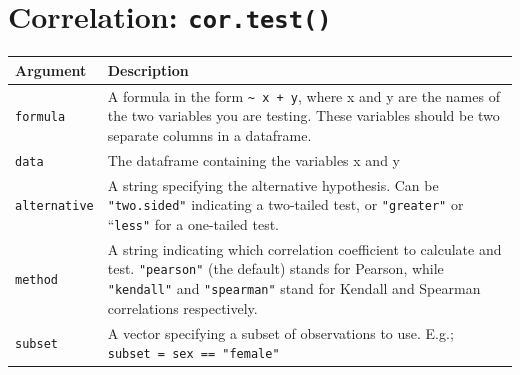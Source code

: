 \documentclass[]{book}
\theoremstyle{definition}
\theoremstyle{definition}
\theoremstyle{remark}
\begin{document}
\section{\texorpdfstring{Correlation:
\texttt{cor.test()}}{Correlation: cor.test()}}\label{correlation-cor.test}

\begin{longtable}[]{@{}ll@{}}
\toprule
\begin{minipage}[b]{0.18\columnwidth}\raggedright\strut
Argument\strut
\end{minipage} & \begin{minipage}[b]{0.67\columnwidth}\raggedright\strut
Description\strut
\end{minipage}\tabularnewline
\midrule
\endhead
\begin{minipage}[t]{0.18\columnwidth}\raggedright\strut
\texttt{formula}\strut
\end{minipage} & \begin{minipage}[t]{0.67\columnwidth}\raggedright\strut
A formula in the form \texttt{\textasciitilde{}\ x\ +\ y}, where x and y
are the names of the two variables you are testing. These variables
should be two separate columns in a dataframe.\strut
\end{minipage}\tabularnewline
\begin{minipage}[t]{0.18\columnwidth}\raggedright\strut
\texttt{data}\strut
\end{minipage} & \begin{minipage}[t]{0.67\columnwidth}\raggedright\strut
The dataframe containing the variables x and y\strut
\end{minipage}\tabularnewline
\begin{minipage}[t]{0.18\columnwidth}\raggedright\strut
\texttt{alternative}\strut
\end{minipage} & \begin{minipage}[t]{0.67\columnwidth}\raggedright\strut
A string specifying the alternative hypothesis. Can be
\texttt{"two.sided"} indicating a two-tailed test, or \texttt{"greater"}
or ``\texttt{less"} for a one-tailed test.\strut
\end{minipage}\tabularnewline
\begin{minipage}[t]{0.18\columnwidth}\raggedright\strut
\texttt{method}\strut
\end{minipage} & \begin{minipage}[t]{0.67\columnwidth}\raggedright\strut
A string indicating which correlation coefficient to calculate and test.
\texttt{"pearson"} (the default) stands for Pearson, while
\texttt{"kendall"} and \texttt{"spearman"} stand for Kendall and
Spearman correlations respectively.\strut
\end{minipage}\tabularnewline
\begin{minipage}[t]{0.18\columnwidth}\raggedright\strut
\texttt{subset}\strut
\end{minipage} & \begin{minipage}[t]{0.67\columnwidth}\raggedright\strut
A vector specifying a subset of observations to use. E.g.;
\texttt{subset\ =\ sex\ ==\ "female"}\strut
\end{minipage}\tabularnewline
\bottomrule
\end{longtable}
\end{document}
